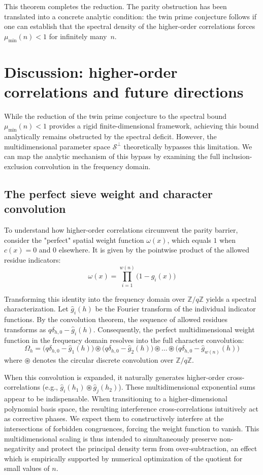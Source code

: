 \documentclass[reqno,notitlepage]{amsart}
\theoremstyle{remark}
\begin{document}
This theorem completes the reduction. The parity obstruction has been translated into a
concrete analytic condition: the twin prime conjecture follows if one can establish that
the spectral density of the higher-order correlations forces $\mu_{\min}(n) < 1$ for
infinitely many~$n$.

\section{Discussion: higher-order correlations and future directions} \label{sec:discussion}

While the reduction of the twin prime conjecture to the spectral bound $\mu_{\min}(n) < 1$ provides
a rigid finite-dimensional framework, achieving this bound analytically remains obstructed
by the spectral deficit. However, the multidimensional parameter space
$\mathcal{S}^{\perp}$ theoretically bypasses this limitation. We can map the analytic
mechanism of this bypass by examining the full inclusion-exclusion convolution in the frequency domain.

\subsection{The perfect sieve weight and character convolution}

To understand how higher-order correlations circumvent the parity barrier, consider the "perfect"
spatial weight function $\omega(x)$, which equals $1$ when $c(x) = 0$ and $0$ elsewhere.
It is given by the pointwise product of the allowed residue indicators:
\[ \omega(x) = \prod_{i=1}^{w(n)} \big(1 - g_i(x)\big) \]

Transforming this identity into the frequency domain over $\mathbb{Z}/q\mathbb{Z}$
yields a spectral characterization. Let $\hat{g}_i(h)$ be the Fourier transform
of the individual indicator functions. By the convolution theorem, the sequence of allowed
residues transforms as $q\delta_{h,0} - \hat{g}_i(h)$. Consequently, the
perfect multidimensional weight function in the frequency domain resolves into the full
character convolution:
\[ \Omega_h = \big(q\delta_{h,0} - \hat{g}_1(h)\big) \circledast \big(q\delta_{h,0} - \hat{g}_2(h)\big) \circledast \dots \circledast \big(q\delta_{h,0} - \hat{g}_{w(n)}(h)\big) \]
where $\circledast$ denotes the circular discrete convolution over $\mathbb{Z}/q\mathbb{Z}$.

When this convolution is expanded, it naturally generates higher-order cross-correlations (e.g.,
$\hat{g}_i(h_1) \circledast \hat{g}_j(h_2)$). These multidimensional exponential sums appear to be
indispensable. When transitioning to a higher-dimensional polynomial basis space, the resulting
interference cross-correlations intuitively act as corrective phases. We expect them to constructively
interfere at the intersections of forbidden congruences, forcing the weight function to vanish. This
multidimensional scaling is thus intended to simultaneously preserve non-negativity and protect
the principal density term from over-subtraction, an effect which is empirically supported by
numerical optimization of the quotient for small values of $n$.
\end{document}
